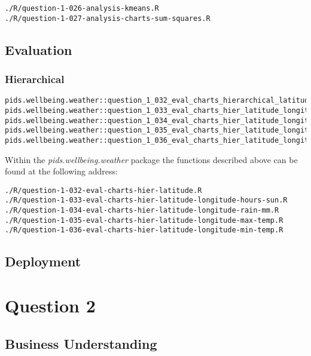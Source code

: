 \documentclass[12pt, oneside, openany]{book}
\begin{document}
\begin{verbatim}
./R/question-1-026-analysis-kmeans.R
./R/question-1-027-analysis-charts-sum-squares.R
\end{verbatim}

\section*{Evaluation}

\subsection*{Hierarchical}

\begin{verbatim}
pids.wellbeing.weather::question_1_032_eval_charts_hierarchical_latitude()
pids.wellbeing.weather::question_1_033_eval_charts_hier_latitude_longitude_hours_sun()
pids.wellbeing.weather::question_1_034_eval_charts_hier_latitude_longitude_rain_mm()
pids.wellbeing.weather::question_1_035_eval_charts_hier_latitude_longitude_max_temp()
pids.wellbeing.weather::question_1_036_eval_charts_hier_latitude_longitude_min_temp()
\end{verbatim}

Within the \emph{pids.wellbeing.weather} package the functions described above can be found at the following address:

\begin{verbatim}
./R/question-1-032-eval-charts-hier-latitude.R
./R/question-1-033-eval-charts-hier-latitude-longitude-hours-sun.R
./R/question-1-034-eval-charts-hier-latitude-longitude-rain-mm.R
./R/question-1-035-eval-charts-hier-latitude-longitude-max-temp.R
./R/question-1-036-eval-charts-hier-latitude-longitude-min-temp.R
\end{verbatim}

\section*{Deployment}

\setcounter{equation}{0}
\chapter*{Question 2}

\section*{Business Understanding}
\end{document}
